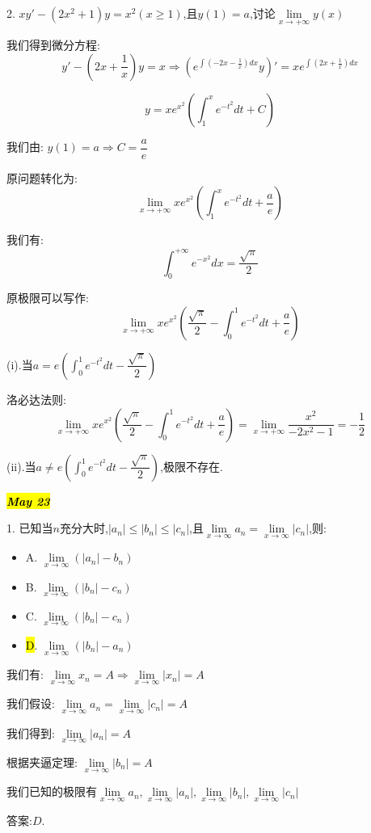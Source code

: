2. $xy'-(2x^2+1)y=x^2(x\geq 1)$,且$y(1)=a$,讨论$\lim\limits_{x\rightarrow +\infty}y(x)$
\begin{solution}
	
	我们得到微分方程: 
	$$y'-(2x+\frac{1}{x})y=x\Rightarrow (e^{\int (-2x-\frac{1}{x})dx}y)'=xe^{\int (2x+\frac{1}{x})dx}$$
	
	$$y=xe^{x^2}(\int_{1}^{x}e^{-t^2}dt+C)$$
	
	我们由: $y(1)=a\Rightarrow C=\dfrac{a}{e}$
	
	原问题转化为: 
	$$\lim\limits_{x\rightarrow +\infty}xe^{x^2}(\int_{1}^{x}e^{-t^2}dt+\frac{a}{e})$$
	
	我们有: $$\int_{0}^{+\infty}e^{-x^2}dx=\frac{\sqrt{\pi}}{2}$$
	
	原极限可以写作: 
	$$\lim\limits_{x\rightarrow +\infty}xe^{x^2}(\frac{\sqrt{\pi}}{2}-\int_{0}^{1}e^{-t^2}dt+\frac{a}{e})$$
	
	(i).当$a=e(\int_{0}^{1}e^{-t^2}dt-\dfrac{\sqrt{\pi}}{2})$
	
	洛必达法则: $$\lim\limits_{x\rightarrow +\infty}xe^{x^2}(\frac{\sqrt{\pi}}{2}-\int_{0}^{1}e^{-t^2}dt+\frac{a}{e})=\lim\limits_{x\rightarrow +\infty}\frac{x^2}{-2x^2-1}=-\frac{1}{2}$$
	
	(ii).当$a\neq e(\int_{0}^{1}e^{-t^2}dt-\dfrac{\sqrt{\pi}}{2})$,极限不存在.
\end{solution}

\hl{\textbf{\textit{May 23}}}

1. 已知当$n$充分大时,$|a_{n}|\leq |b_{n}|\leq |c_{n}|$,且$\lim\limits_{x\rightarrow \infty}a_{n}=\lim\limits_{x\rightarrow \infty}|c_{n}|$,则: 
\begin{itemize}
	\item A. $\lim\limits_{x\rightarrow \infty}(|a_{n}|-b_{n})$
	\item B. $\lim\limits_{x\rightarrow \infty}(|b_{n}|-c_{n})$
	\item C. $\lim\limits_{x\rightarrow \infty}(|b_{n}|-c_{n})$
	\item \hl{D}. $\lim\limits_{x\rightarrow \infty}(|b_{n}|-a_{n})$
\end{itemize}
\begin{solution}
	
	我们有: $\lim\limits_{x\rightarrow \infty}x_{n}=A\Rightarrow \lim\limits_{x\rightarrow \infty}|x_{n}|=A$
	
	我们假设: $\lim\limits_{x\rightarrow \infty}a_{n}=\lim\limits_{x\rightarrow \infty}|c_{n}|=A$
	
	我们得到: $\lim\limits_{x\rightarrow \infty}|a_{n}|=A$
	
	根据夹逼定理: $\lim\limits_{x\rightarrow \infty}|b_{n}|=A$
	
	我们已知的极限有$\lim\limits_{x\rightarrow \infty}a_{n},\lim\limits_{x\rightarrow \infty}|a_{n}|,\lim\limits_{x\rightarrow \infty}|b_{n}|,\lim\limits_{x\rightarrow \infty}|c_{n}|$
	
	答案:$D$.
\end{solution}

